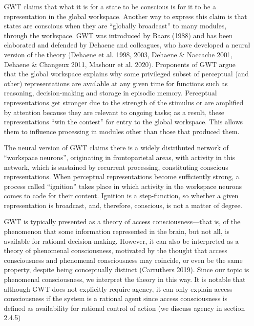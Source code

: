 \documentclass[12pt]{article}
\begin{document}
GWT claims that what it is for a state to be conscious is for it to be a representation in the global workspace. Another way to express this claim is that states are conscious when they are ``globally broadcast'' to many modules, through the workspace. GWT was introduced by Baars (1988) and has been elaborated and defended by Dehaene and colleagues, who have developed a neural version of the theory (Dehaene et al. 1998, 2003, Dehaene \& Naccache 2001, Dehaene \& Changeux 2011, Mashour et al. 2020). Proponents of GWT argue that the global workspace explains why some privileged subset of perceptual (and other) representations are available at any given time for functions such as reasoning, decision-making and storage in episodic memory. Perceptual representations get stronger due to the strength of the stimulus or are amplified by attention because they are relevant to ongoing tasks; as a result, these representations ``win the contest'' for entry to the global workspace. This allows them to influence processing in modules other than those that produced them.

The neural version of GWT claims there is a widely distributed network of ``workspace neurons'', originating in frontoparietal areas, with activity in this network, which is sustained by recurrent processing, constituting conscious representations. When perceptual representations become sufficiently strong, a process called ``ignition'' takes place in which activity in the workspace neurons comes to code for their content. Ignition is a step-function, so whether a given representation is broadcast, and, therefore, conscious, is not a matter of degree.

\setlength{\intextsep}{20pt} %


GWT is typically presented as a theory of access consciousness—that is, of the phenomenon that some information represented in the brain, but not all, is available for rational decision-making. However, it can also be interpreted as a theory of phenomenal consciousness, motivated by the thought that access consciousness and phenomenal consciousness may coincide, or even be the same property, despite being conceptually distinct (Carruthers 2019). Since our topic is phenomenal consciousness, we interpret the theory in this way. It is notable that although GWT does not explicitly require agency, it can only explain access consciousness if the system is a rational agent since access consciousness is defined as availability for rational control of action (we discuss agency in section 2.4.5)
\end{document}
